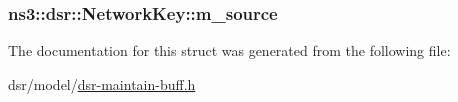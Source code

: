 \subsubsection[{\texorpdfstring{m\+\_\+source}{m_source}}]{ ns3\+::dsr\+::\+Network\+Key\+::m\+\_\+source}\hypertarget{structns3_1_1dsr_1_1NetworkKey_ad4728cd50cd0dc4cef5bf656da682a2e}{}\label{structns3_1_1dsr_1_1NetworkKey_ad4728cd50cd0dc4cef5bf656da682a2e}


The documentation for this struct was generated from the following file\+:\begin{DoxyCompactItemize}
\item 
dsr/model/\hyperlink{dsr-maintain-buff_8h}{dsr-\/maintain-\/buff.\+h}\end{DoxyCompactItemize}
